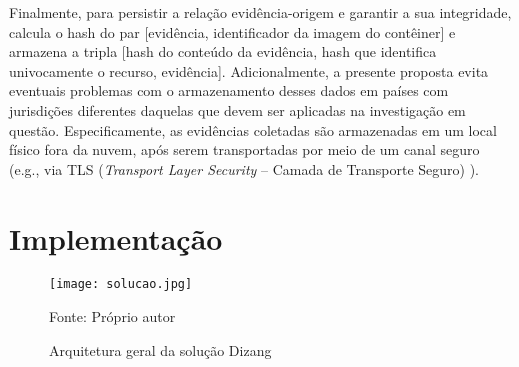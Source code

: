 Finalmente, para persistir a relação evidência-origem e garantir a sua integridade, \fancyname calcula o hash do par [evidência, identificador da imagem do contêiner] e armazena a tripla [hash do conteúdo da evidência, hash que identifica univocamente o recurso, evidência].
%
Adicionalmente, a presente proposta evita eventuais problemas com o armazenamento desses dados em países com jurisdições diferentes daquelas que devem ser aplicadas na investigação em questão.
%
Especificamente, as evidências coletadas são armazenadas em um local físico fora da nuvem, após serem transportadas por meio de um canal seguro (e.g., via TLS (\textit{Transport Layer Security} -- Camada de Transporte Seguro) \cite{DierksT2008}).
%

\section{Implementação}
\label{sec:proposta-impl}


\begin{figure}[htb!]
\footnotesize
\caption{Arquitetura geral da solução Dizang}
\texttt{[image: solucao.jpg]}
\centering
\label{fig:Solucao}
\begin{center}
Fonte: Próprio autor 
\end{center}
\end{figure}

